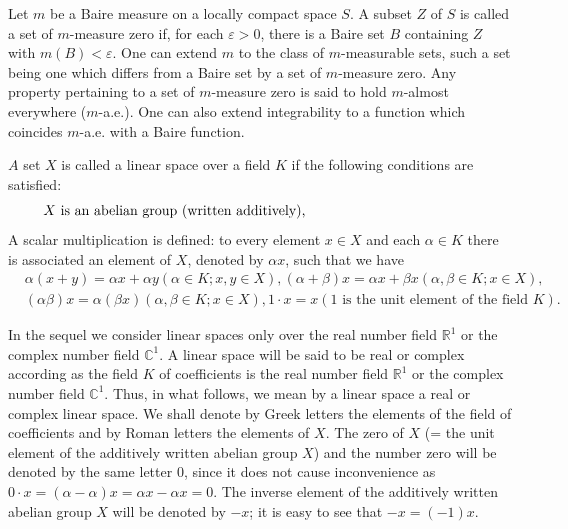\begin{remarku} Let $m$ be a Baire measure on a locally compact space $S$. A subset $Z$ of $S$ is called a set of $m$-measure zero if, for each $\varepsilon > 0$, there is a Baire set $B$ containing $Z$ with $m(B) < \varepsilon$. One can extend $m$ to the class of $m$-measurable sets, such a set being one which differs from a Baire set by a set of $m$-measure zero. Any property pertaining to a set of $m$-measure zero is said to hold $m$-almost everywhere ($m$-a.e.). One can also extend integrability to a function which coincides $m$-a.e. with a Baire function. 
\end{remarku}


\label{sec:0.4}


\begin{definitionu} $A$ set $X$ is called a linear space over a field $K$ if the following conditions are satisfied: 
\begin{equation}\label{eq:0.4.1}
\parbox{0.90\linewidth}{$X$ is an abelian group (written additively),}
\end{equation}
A scalar multiplication is defined: to every element $x \in X$ and each $\alpha \in K$ there is associated an element of $X$, denoted by $\alpha x$, such that we have 
\begin{equation}\label{eq:0.4.2}
\begin{aligned}
&\alpha (x + y) = \alpha x + \alpha y (\alpha \in K; x, y \in X), (\alpha + \beta) x = \alpha x + \beta x (\alpha , \beta \in K; x \in X),
\\
&(\alpha \beta) x = \alpha (\beta x) (\alpha , \beta \in K; x \in X), 1 \cdot x = x (1 \text{ is the unit element of the field } K).
\end{aligned}
\end{equation}
\end{definitionu}

In the sequel we consider linear spaces only over the real number field $\mathbb{R}^{1}$ or the complex number field $\mathbb{C}^{1}$. A linear space will be said to be real or complex according as the field $K$ of coefficients is the real number field $\mathbb{R}^{1}$ or the complex number field $\mathbb{C}^{1}$. Thus, in what follows, we mean by a linear space a real or complex linear space. We shall denote by Greek letters the elements of the field of coefficients and by Roman letters the elements of $X$. The zero of $X$ (= the unit element of the additively written abelian group $X$) and the number zero will be denoted by the same letter $0$, since it does not cause inconvenience as $0 \cdot x = (\alpha- \alpha)x = \alpha x- \alpha x = 0$. The inverse element of the additively written abelian group $X$ will be denoted by $-x$; it is easy to see that $-x = (-1)x$. 

